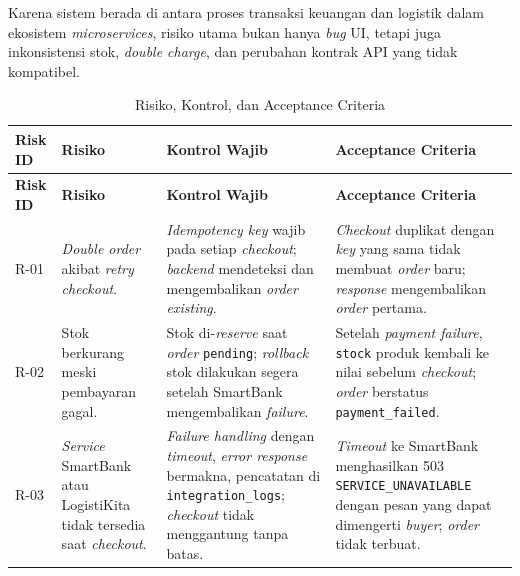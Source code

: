 
Karena sistem berada di antara proses transaksi keuangan dan logistik dalam
ekosistem \textit{microservices}, risiko utama bukan hanya \textit{bug} UI,
tetapi juga inkonsistensi stok, \textit{double charge}, dan perubahan kontrak
API yang tidak kompatibel.

\begin{longtable}{|L{1cm}|L{3.5cm}|L{4.5cm}|L{5.5cm}|}
    \caption{Risiko, Kontrol, dan Acceptance Criteria}
    \label{tab:risiko} \\
    \hline
    \textbf{Risk ID} & \textbf{Risiko} & \textbf{Kontrol Wajib}
        & \textbf{Acceptance Criteria} \\
    \hline
    \endfirsthead
    \hline
    \textbf{Risk ID} & \textbf{Risiko} & \textbf{Kontrol Wajib}
        & \textbf{Acceptance Criteria} \\
    \hline
    \endhead
    \hline
    \endfoot
    R-01
        & \textit{Double order} akibat \textit{retry checkout}.
        & \textit{Idempotency key} wajib pada setiap \textit{checkout};
          \textit{backend} mendeteksi dan mengembalikan \textit{order existing}.
        & \textit{Checkout} duplikat dengan \textit{key} yang sama tidak membuat
          \textit{order} baru; \textit{response} mengembalikan \textit{order}
          pertama. \\
    \hline
    R-02
        & Stok berkurang meski pembayaran gagal.
        & Stok di-\textit{reserve} saat \textit{order} \texttt{pending};
          \textit{rollback} stok dilakukan segera setelah SmartBank mengembalikan
          \textit{failure}.
        & Setelah \textit{payment failure}, \texttt{stock} produk kembali ke
          nilai sebelum \textit{checkout}; \textit{order} berstatus
          \texttt{payment\_failed}. \\
    \hline
    R-03
        & \textit{Service} SmartBank atau LogistiKita tidak tersedia saat
          \textit{checkout}.
        & \textit{Failure handling} dengan \textit{timeout}, \textit{error
          response} bermakna, pencatatan di \texttt{integration\_logs};
          \textit{checkout} tidak menggantung tanpa batas.
        & \textit{Timeout} ke SmartBank menghasilkan 503
          \texttt{SERVICE\_UNAVAILABLE} dengan pesan yang dapat dimengerti
          \textit{buyer}; \textit{order} tidak terbuat. \\

\end{longtable}
